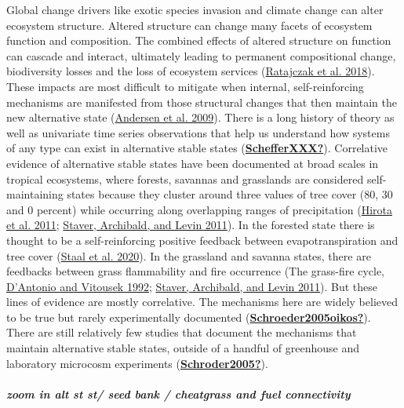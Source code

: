 \documentclass[
  12pt,
]{article}
\begin{document}
Global change drivers like exotic species invasion and climate change
can alter ecosystem structure. Altered structure can change many facets
of ecosystem function and composition. The combined effects of altered
structure on function can cascade and interact, ultimately leading to
permanent compositional change, biodiversity losses and the loss of
ecosystem services (\protect\hyperlink{ref-Ratajczak2018}{Ratajczak et
al. 2018}). These impacts are most difficult to mitigate when internal,
self-reinforcing mechanisms are manifested from those structural changes
that then maintain the new alternative state
(\protect\hyperlink{ref-Andersen2009}{Andersen et al. 2009}). There is a
long history of theory as well as univariate time series observations
that help us understand how systems of any type can exist in alternative
stable states
(\protect\hyperlink{ref-SchefferXXX}{\textbf{SchefferXXX?}}).
Correlative evidence of alternative stable states have been documented
at broad scales in tropical ecosystems, where forests, savannas and
grasslands are considered self-maintaining states because they cluster
around three values of tree cover (80, 30 and 0 percent) while occurring
along overlapping ranges of precipitation
(\protect\hyperlink{ref-Hirota2011}{Hirota et al. 2011};
\protect\hyperlink{ref-Staver2011}{Staver, Archibald, and Levin 2011}).
In the forested state there is thought to be a self-reinforcing positive
feedback between evapotranspiration and tree cover
(\protect\hyperlink{ref-Staal2020}{Staal et al. 2020}). In the grassland
and savanna states, there are feedbacks between grass flammability and
fire occurrence (The grass-fire cycle,
\protect\hyperlink{ref-DAntonio1992}{D'Antonio and Vitousek 1992};
\protect\hyperlink{ref-Staver2011}{Staver, Archibald, and Levin 2011}).
But these lines of evidence are mostly correlative. The mechanisms here
are widely believed to be true but rarely experimentally documented
(\protect\hyperlink{ref-Schroeder2005oikos}{\textbf{Schroeder2005oikos?}}).
There are still relatively few studies that document the mechanisms that
maintain alternative stable states, outside of a handful of greenhouse
and laboratory microcosm experiments
(\protect\hyperlink{ref-Schroder2005}{\textbf{Schroder2005?}}).

\hypertarget{zoom-in-alt-st-st-seed-bank-cheatgrass-and-fuel-connectivity}{%
\subparagraph{zoom in alt st st/ seed bank / cheatgrass and fuel
connectivity}\label{zoom-in-alt-st-st-seed-bank-cheatgrass-and-fuel-connectivity}}
\end{document}
